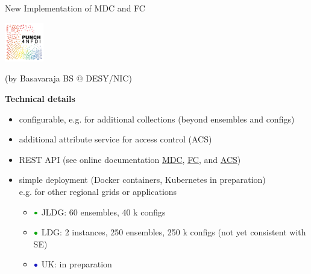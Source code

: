 \documentclass[aspectratio=169,xcolor=dvipsnames]{beamer}
\newcommand{\blue}{\color{b1}}
\newcommand{\green}{\color{g3}}
\newcommand{\bi}{\begin{itemize}}
\newcommand{\ei}{\end{itemize}}
\begin{document}
\begin{frame}{New Implementation of MDC and FC}

  \vspace*{-5mm}
  \hfill \includegraphics[height=17mm]{figs1/PUNCH4NFDI-Logo_RGB.jpg}

  \vspace*{-22mm}
  \begin{center}
    (by Basavaraja BS $@$ DESY/NIC)
  \end{center}
  
  {\bf Technical details} 
  \bi %
  \item configurable, e.g. for additional collections (beyond ensembles and configs)
  \item additional attribute service for access control (ACS)
  \item REST API (see online documentation
    \href{https://idefix-vm10.zeuthen.desy.de/ildg/mdc/swagger-ui/index.html}{MDC},
    \href{https://idefix-vm10.zeuthen.desy.de/ildg/fc/swagger-ui/index.html}{FC}, and
    \href{https://idefix-vm10.zeuthen.desy.de/ildg/acs/swagger-ui/index.html}{ACS})
  \item simple deployment (Docker containers, Kubernetes in preparation)\\
    e.g. for other regional grids or applications
    \bi
    \item[$\green\bullet$] JLDG: 60 ensembles, 40 k configs \\
    \item[$\green\bullet$] LDG: 2 instances, 250 ensembles, 250 k configs (not yet consistent with SE)
    \item[$\blue\bullet$] UK: in preparation
    \ei
  \ei
  \vfill
\end{frame}
\end{document}
